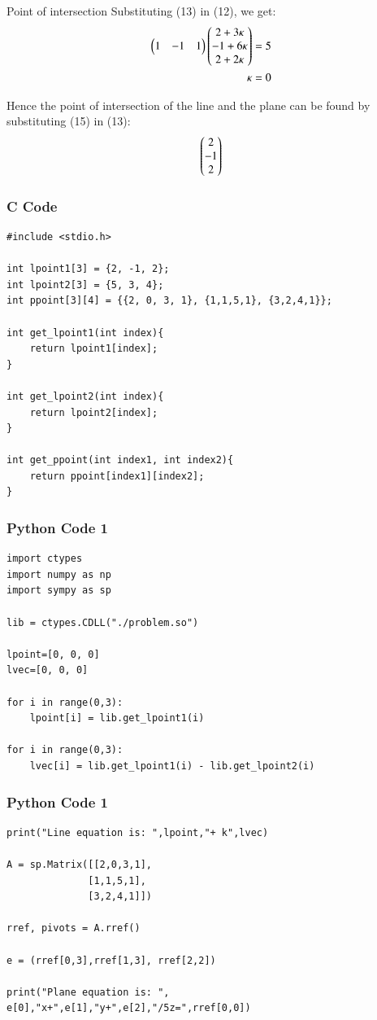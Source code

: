 \documentclass{beamer}
\begin{document}
\begin{frame}{Point of intersection}
Substituting (13) in (12), we get:
\begin{align}
    \begin{pmatrix}1&-1&1\end{pmatrix}\begin{pmatrix}2+3\kappa\\-1+6\kappa\\2+2\kappa\end{pmatrix}=5\\
    \kappa = 0
\end{align}

Hence the point of intersection of the line and the plane can be found by substituting (15) in (13):
\begin{align}
    \begin{pmatrix}2\\-1\\2\end{pmatrix}
\end{align}
\end{frame}


\begin{frame}[fragile]
    \frametitle{C Code}
    \begin{lstlisting}
#include <stdio.h>

int lpoint1[3] = {2, -1, 2};
int lpoint2[3] = {5, 3, 4};
int ppoint[3][4] = {{2, 0, 3, 1}, {1,1,5,1}, {3,2,4,1}};

int get_lpoint1(int index){
    return lpoint1[index];
}

int get_lpoint2(int index){
    return lpoint2[index];
}

int get_ppoint(int index1, int index2){
    return ppoint[index1][index2];
}
    \end{lstlisting}
\end{frame}

\begin{frame}[fragile]
    \frametitle{Python Code 1}
    \begin{lstlisting}
import ctypes
import numpy as np
import sympy as sp

lib = ctypes.CDLL("./problem.so")

lpoint=[0, 0, 0]
lvec=[0, 0, 0]

for i in range(0,3):
    lpoint[i] = lib.get_lpoint1(i)

for i in range(0,3):
    lvec[i] = lib.get_lpoint1(i) - lib.get_lpoint2(i)
    \end{lstlisting}
\end{frame}

\begin{frame}[fragile]
    \frametitle{Python Code 1}
    \begin{lstlisting}
print("Line equation is: ",lpoint,"+ k",lvec)

A = sp.Matrix([[2,0,3,1],
              [1,1,5,1],
              [3,2,4,1]])

rref, pivots = A.rref()

e = (rref[0,3],rref[1,3], rref[2,2])

print("Plane equation is: ", e[0],"x+",e[1],"y+",e[2],"/5z=",rref[0,0])
    \end{lstlisting}
\end{frame}
\end{document}

